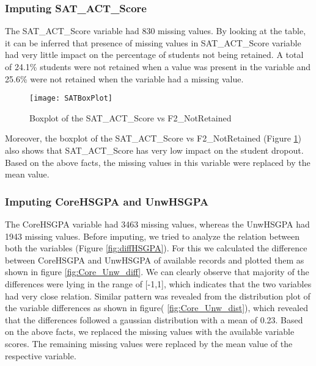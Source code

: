 \documentclass[11pt,openright]{report}
\begin{document}
\subsubsection {Imputing SAT\_ACT\_Score}
The SAT\_ACT\_Score variable had 830 missing values. By looking at the table, it can be inferred that presence of missing values in SAT\_ACT\_Score variable had very little impact on the percentage of students not being retained. A total of 24.1\% students were not retained when a value was present in the variable and 25.6\% were not retained when the variable had a missing value.

\begin{figure}[!htbp]
	\centering
	\texttt{[image: SATBoxPlot]}
	\caption{Boxplot of the SAT\_ACT\_Score vs F2\_NotRetained}
	\label{fig:Sat_F2NotRetained_plot}
\end{figure}

Moreover, the boxplot of the SAT\_ACT\_Score vs F2\_NotRetained (Figure \ref{fig:Sat_F2NotRetained_plot}) also shows that SAT\_ACT\_Score has very low impact on the student dropout. Based on the above facts, the missing values in this variable were replaced by the mean value. 

\subsubsection {Imputing CoreHSGPA and UnwHSGPA}
The CoreHSGPA variable had 3463 missing values, whereas the UnwHSGPA had 1943 missing values. Before imputing, we tried to analyze the relation between both the variables (Figure \ref{fig:diffHSGPA}). For this we calculated the difference between CoreHSGPA and UnwHSGPA of available records and plotted them as shown in figure \ref{fig:Core_Unw_diff}. We can clearly observe that majority of the differences were lying in the range of [-1,1], which indicates that the two variables had very close relation. Similar pattern was revealed from the distribution plot of the variable differences as shown in figure( \ref{fig:Core_Unw_dist}), which revealed that the differences followed a gaussian distribution with a mean of 0.23. Based on the above facts, we replaced the missing values with the available variable scores. The remaining missing values were replaced by the mean value of the respective variable.
\end{document}
